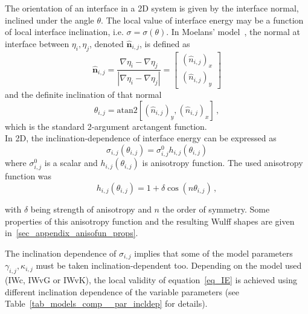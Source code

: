 		The orientation of an interface in a 2D system is given by the interface normal, inclined under the angle $\theta$. The local value of interface energy may be a function of local interface inclination, i.e. $\sigma = \sigma(\theta)$. In Moelans' model~\cite{Moelans2008}, the normal at interface between $\eta_i,\eta_j$, denoted $\hat{\bm{n}}_{i,j}$, is defined as 
		\begin{equation} \label{eq_def_inclination}
			\hat{\bm{n}}_{i,j} = \frac{\nabla\eta_i-\nabla\eta_j}{|\nabla\eta_i-\nabla\eta_j|} = \left[\begin{array}{c}
				(\hat{n}_{i,j})_x   \\
				(\hat{n}_{i,j})_y
			\end{array} \right]
		\end{equation}
		and the definite inclination of that normal 
		\begin{equation}
			\theta_{i,j} = \mathrm{atan2}[(\hat{n}_{i,j})_y,(\hat{n}_{i,j})_x] \,,
		\end{equation}
		which is the standard 2-argument arctangent function.\\
		In 2D, the inclination-dependence of interface energy can be expressed as 
		\begin{equation}\label{eq_IE_incldep}
			\sigma_{i,j}(\theta_{i,j}) = \sigma_{i,j}^0h_{i,j}(\theta_{i,j})
		\end{equation}
		where $\sigma_{i,j}^0$ is a scalar and  $h_{i,j}(\theta_{i,j})$ is anisotropy function. The used anisotropy function was
		\begin{equation}
			h_{i,j}(\theta_{i,j}) = 1 + \delta\cos(n\theta_{i,j}) \,,
		\end{equation}
		
		with $\delta$ being strength of anisotropy and $n$ the order of symmetry. Some properties of this anisotropy function and the resulting Wulff shapes are given in~\ref{sec_appendix_anisofun_props}. 
		
		The inclination dependence of $\sigma_{i,j}$ implies that some of the model parameters $\gamma_{i,j},\kappa_{i,j}$ must be taken inclination-dependent too. Depending on the model used (IWc, IWvG or IWvK), the local validity of equation~\eqref{eq_IE} is achieved using different inclination dependence of the variable parameters (see Table~\ref{tab_models_comp__par_incldep} for details).
		
